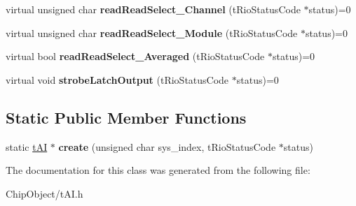 \begin{DoxyCompactItemize}
\item 
\hypertarget{classnFPGA_1_1nFRC__2012__1__6__4_1_1tAI_a8022dc07bbde29a8aca4b13b82d812e0}{
virtual unsigned char {\bfseries readReadSelect\_\-Channel} (tRioStatusCode $\ast$status)=0}
\label{classnFPGA_1_1nFRC__2012__1__6__4_1_1tAI_a8022dc07bbde29a8aca4b13b82d812e0}

\item 
\hypertarget{classnFPGA_1_1nFRC__2012__1__6__4_1_1tAI_a39baf45ed1622d63c3a803e78ece1a39}{
virtual unsigned char {\bfseries readReadSelect\_\-Module} (tRioStatusCode $\ast$status)=0}
\label{classnFPGA_1_1nFRC__2012__1__6__4_1_1tAI_a39baf45ed1622d63c3a803e78ece1a39}

\item 
\hypertarget{classnFPGA_1_1nFRC__2012__1__6__4_1_1tAI_ae13bb3bef9b94ebacafd4e9bdfd33b00}{
virtual bool {\bfseries readReadSelect\_\-Averaged} (tRioStatusCode $\ast$status)=0}
\label{classnFPGA_1_1nFRC__2012__1__6__4_1_1tAI_ae13bb3bef9b94ebacafd4e9bdfd33b00}

\item 
\hypertarget{classnFPGA_1_1nFRC__2012__1__6__4_1_1tAI_a537128f97a018a2cfed4dd64cdecd10a}{
virtual void {\bfseries strobeLatchOutput} (tRioStatusCode $\ast$status)=0}
\label{classnFPGA_1_1nFRC__2012__1__6__4_1_1tAI_a537128f97a018a2cfed4dd64cdecd10a}

\end{DoxyCompactItemize}
\subsection*{Static Public Member Functions}
\begin{DoxyCompactItemize}
\item 
\hypertarget{classnFPGA_1_1nFRC__2012__1__6__4_1_1tAI_ae52d734e177fcaa6f89217cae955b7f2}{
static \hyperlink{classnFPGA_1_1nFRC__2012__1__6__4_1_1tAI}{tAI} $\ast$ {\bfseries create} (unsigned char sys\_\-index, tRioStatusCode $\ast$status)}
\label{classnFPGA_1_1nFRC__2012__1__6__4_1_1tAI_ae52d734e177fcaa6f89217cae955b7f2}

\end{DoxyCompactItemize}


The documentation for this class was generated from the following file:\begin{DoxyCompactItemize}
\item 
ChipObject/tAI.h\end{DoxyCompactItemize}
